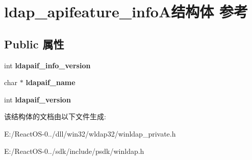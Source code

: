 \hypertarget{structldap__apifeature__info_a}{}\section{ldap\+\_\+apifeature\+\_\+info\+A结构体 参考}
\label{structldap__apifeature__info_a}
\subsection*{Public 属性}
\begin{DoxyCompactItemize}
\item 
\mbox{\label{structldap__apifeature__info_a_ae6f5bf4b30789b65c34a135e3b621bee}} 
int {\bfseries ldapaif\+\_\+info\+\_\+version}
\item 
\mbox{\label{structldap__apifeature__info_a_a399056ab6ce6fc1cb0b18f0e167937fe}} 
char $\ast$ {\bfseries ldapaif\+\_\+name}
\item 
\mbox{\label{structldap__apifeature__info_a_a30ca43c598c6875206fc7125bde3ccde}} 
int {\bfseries ldapaif\+\_\+version}
\end{DoxyCompactItemize}


该结构体的文档由以下文件生成\+:\begin{DoxyCompactItemize}
\item 
E\+:/\+React\+O\+S-\/0../dll/win32/wldap32/winldap\+\_\+private.\+h\item 
E\+:/\+React\+O\+S-\/0../sdk/include/psdk/winldap.\+h\end{DoxyCompactItemize}
